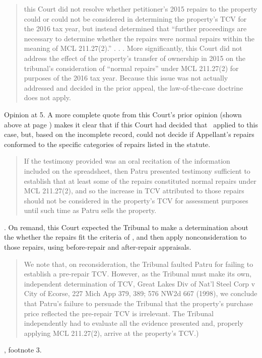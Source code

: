 \documentclass[12pt,\documentclassflag]{michiganCourtOfAppealsBrief}
\begin{document}
\begin{quote}
  this Court did not resolve whether petitioner's 2015 repairs to the property could or could not be considered in determining the property's TCV for the 2016 tax year, but instead
determined that ``further proceedings are necessary to determine whether the repairs were normal
repairs within the meaning of MCL 211.27(2).'' . . . More significantly, this Court
did not address the effect of the property's transfer of ownership in 2015 on the tribunal's
consideration of ``normal repairs'' under MCL 211.27(2) for purposes of the 2016 tax year.
Because this issue was not actually addressed and decided in the prior appeal, the law-of-the-case
doctrine does not apply.
\end{quote}
Opinion at 5.
A more complete quote from this Court's prior opinion (shown above at page \pageref{firstHolding}) makes it clear that if this Court had decided that \mathieuGast\ applied to this case, but, based on the incomplete record, could not decide if Appellant's repairs conformed to the specific categories of repairs listed in the statute.

\begin{quote}
  If the testimony provided was an oral recitation of the
information included on the spreadsheet, then Patru presented testimony sufficient to establish
that at least some of the repairs constituted normal repairs under MCL 211.27(2), and so the
increase in TCV attributed to those repairs should not be considered in the property's TCV for
assessment purposes until such time as Patru sells the property.
\end{quote}
. On remand, this Court expected the Tribunal to make a determination about the whether the repairs fit the criteria of \mathieuGast, and then apply nonconsideration to those repairs, using before-repair and after-repair appraisals.

\begin{quote}
 We note that, on reconsideration, the Tribunal faulted Patru for failing to establish a pre-repair
TCV. However, as the Tribunal must make its own, independent determination of TCV, Great
Lakes Div of Nat'l Steel Corp v City of Ecorse, 227 Mich App 379, 389; 576 NW2d 667 (1998),
we conclude that Patru's failure to persuade the Tribunal that the property's purchase price
reflected the pre-repair TCV is irrelevant. The Tribunal independently had to evaluate all the
evidence presented and, properly applying MCL 211.27(2), arrive at the property's TCV.)
\end{quote}
, footnote 3.
\end{document}
